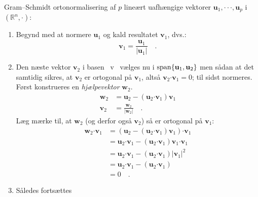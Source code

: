 \begin{method} \label{metodeGramSchmidt}
Gram--Schmidt ortonormalisering af $p$ lineært uafhængige vektorer $\mathbf{u}_{1}, \cdot  \cdot \cdot, \mathbf{u}_{p}$ i $(\mathbb{R}^{n}, \bm{\cdot})$:
\begin{enumerate}
\item Begynd med at normere $\mathbf{u}_{1}$ og kald resultatet $\mathbf{v}_{1}$, dvs.:
\begin{equation}
\mathbf{v}_{1} = \frac{\mathbf{u}_{1}}{\vert \mathbf{u}_{1} \vert} \quad .
\end{equation}
\item Den næste vektor $\mathbf{v}_{2}$ i basen \, v \,  vælges nu i $\mathrm{span}\{\mathbf{u}_{1}, \mathbf{u}_{2}\}$ men sådan at det samtidig sikres, at $\mathbf{v}_{2}$ er ortogonal på $\mathbf{v}_{1}$, altså $\mathbf{v}_{2} {\bm{\cdot}} \mathbf{v}_{1} = 0$; til sidst normeres. Først konstrueres en {\em{hjælpevektor}} $\mathbf{w}_{2}$.
\begin{equation}
\begin{aligned}
\mathbf{w}_{2} &= \mathbf{u}_{2} - \left(\mathbf{u}_{2} \bm{\cdot} \mathbf{v}_{1}\right)\mathbf{v}_{1} \\
\mathbf{v}_{2} &= \frac{\mathbf{w}_{2}}{\vert \mathbf{w}_{2} \vert} \quad .
\end{aligned}
\end{equation}
Læg mærke til, at $\mathbf{w}_{2}$ (og derfor også $\mathbf{v}_{2}$) så er ortogonal på $\mathbf{v}_{1}$:
\begin{equation}
\begin{aligned}
\mathbf{w}_{2} \bm{\cdot} \mathbf{v}_{1} &= \left(\mathbf{u}_{2} - \left(\mathbf{u}_{2} \bm{\cdot} \mathbf{v}_{1}\right)\mathbf{v}_{1}\right) \bm{\cdot} \mathbf{v}_{1} \\
&= \mathbf{u}_{2} \bm{\cdot} \mathbf{v}_{1} - \left(\mathbf{u}_{2} \bm{\cdot} \mathbf{v}_{1} \right) \mathbf{v}_{1} \bm{\cdot} \mathbf{v}_{1} \\
&= \mathbf{u}_{2} \bm{\cdot} \mathbf{v}_{1} - \left(\mathbf{u}_{2} \bm{\cdot} \mathbf{v}_{1} \right) \vert \mathbf{v}_{1} \vert^{2} \\
&=  \mathbf{u}_{2} \bm{\cdot} \mathbf{v}_{1} - \left(\mathbf{u}_{2} \bm{\cdot} \mathbf{v}_{1} \right)\\
&= 0 \quad .
\end{aligned}
\end{equation}
\item Således fortsættes
\begin{equation}

\end{equation}
\end{enumerate}
\end{method}
